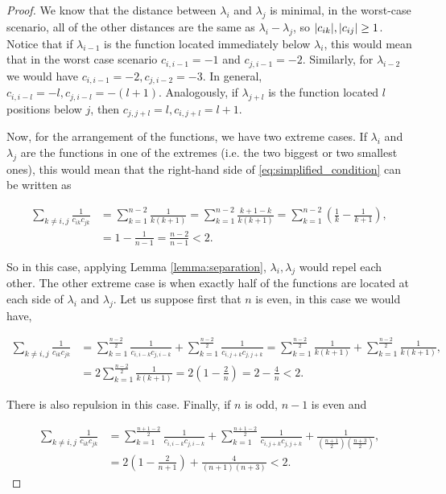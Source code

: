 \begin{proof}
    We know that the distance between $\lambda_i$ and $\lambda_j$ is minimal, in the worst-case scenario, all of the other distances are the same as $\lambda_i - \lambda_j$, so $\lvert c_{ik} \rvert,\lvert c_{ij} \rvert\ge1$. Notice that if $\lambda_{i-1}$ is the function located immediately below $\lambda_i$, this would mean that in the worst case scenario $c_{i,i-1}=-1$ and $c_{j,i-1} = -2$. Similarly, for $\lambda_{i-2}$ we would have $c_{i,i-1} = -2, c_{j,i-2} =-3$. In general, $c_{i,i-l} = -l, c_{j,i-l} = -(l+1)$. Analogously, if $\lambda_{j+l}$ is the function located $l$ positions below $j$, then $c_{j,j+l} = l, c_{i,j+l} = l+1$.

    Now, for the arrangement of the functions, we have two extreme cases. If $\lambda_i$ and $\lambda_j$ are the functions in one of the extremes (i.e. the two biggest or two smallest ones), this would mean that the right-hand side of \eqref{eq:simplified_condition} can be written as

    \begin{align*}
        \sum_{k\neq i,j} \frac{1}{c_{ik}c_{jk}} &= \sum_{k=1}^{n-2} \frac{1}{k(k+1)} = \sum_{k=1}^{n-2} \frac{k+1 - k}{k(k+1)} = \sum_{k=1}^{n-2} \left( \frac{1}{k} - \frac{1}{k+1} \right),\\
        &= 1 - \frac{1}{n-1} = \frac{n-2}{n-1} < 2.
    \end{align*}

    So in this case, applying Lemma \ref{lemma:separation}, $\lambda_i,\lambda_j$ would repel each other. The other extreme case is when exactly half of the functions are located at each side of $\lambda_i$ and $\lambda_j$. Let us suppose first that $n$ is even, in this case we would have,

    \begin{align*}
        \sum_{k\neq i,j} \frac{1}{c_{ik}c_{jk}} &= \sum_{k=1}^{\frac{n-2}{2}} \frac{1}{c_{i,i-k}c_{j,i-k}} + \sum_{k=1}^{\frac{n-2}{2}} \frac{1}{c_{i,j+k}c_{j,j+k}} = \sum_{k=1}^{\frac{n-2}{2}} \frac{1}{k(k+1)} + \sum_{k=1}^{\frac{n-2}{2}} \frac{1}{k(k+1)}, \\
        &= 2 \sum_{k=1}^{\frac{n-2}{2}} \frac{1}{k(k+1)} = 2\left(1 - \frac{2}{n}\right) = 2 - \frac4n < 2.
    \end{align*}

    There is also repulsion in this case. Finally, if $n$ is odd, $n-1$ is even and 

    \begin{align*}
        \sum_{k\neq i,j} \frac{1}{c_{ik}c_{jk}} &= \sum_{k=1}^{\frac{n+1-2}{2}} \frac{1}{c_{i,i-k}c_{j,i-k}} + \sum_{k=1}^{\frac{n+1-2}{2}} \frac{1}{c_{i,j+k}c_{j,j+k}} + \frac{1}{\left(\frac{n+1}{2}\right)\left(\frac{n+3}{2}\right)},\\
        &= 2\left( 1 - \frac{2}{n+1} \right) + \frac{4}{(n+1)(n+3)} < 2.
    \end{align*}
    

\end{proof}
